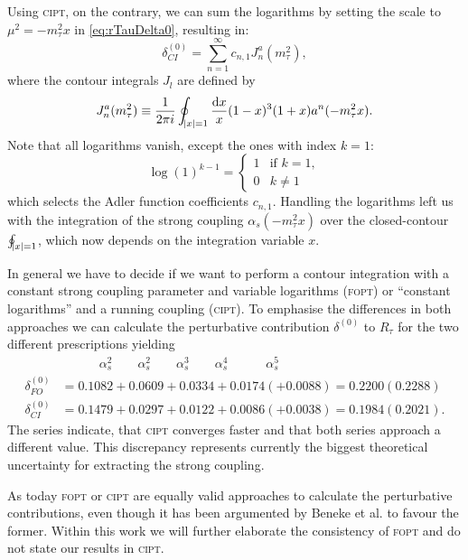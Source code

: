 \documentclass[../../index.tex]{subfiles}
\begin{document}
Using \textsc{cipt}, on the contrary, we can sum the logarithms by setting the
scale to \(\mu^2 = -m_\tau^2 x\) in \cref{eq:rTauDelta0}, resulting in:
\begin{equation}
  \delta^{(0)}_{CI} = \sum_{n=1}^\infty c_{n,1} J_n^a(m_\tau^2),
\end{equation}
where the contour integrals $J_l$ are defined by
\begin{equation}
  J_n^a(m_\tau^2) \equiv \frac{1}{2 \pi i} \oint_{\abs{x}=1} \frac{\dif x}{x} (1-x)^3(1+x) a^n(-m_\tau^2 x).
\end{equation}
Note that all logarithms vanish, except the ones with index \(k=1\):
\begin{equation}
  \log(1)^{k-1} =  \begin{cases} \mbox{1} & \mbox{if } k=1, \\ \mbox{0} & k\neq 1 \end{cases}
\end{equation}
which selects the Adler function coefficients \(c_{n,1}\). Handling the
logarithms left us with the integration of the strong coupling \(\alpha_s(-
m_\tau^2 x)\) over the closed-contour \(\oint_{\abs{x}=1}\), which now depends
on the integration variable \(x\).

In general we have to decide if we want to perform a contour integration with a
constant strong coupling parameter and variable logarithms (\textsc{fopt}) or
``constant logarithms'' and a running coupling (\textsc{cipt}). To emphasise the
differences in both approaches we can calculate the perturbative contribution
\(\delta^{(0)}\) to \(R_\tau\) for the two different prescriptions yielding
\cite{Beneke2008}
\begin{align}
  & \quad\qquad \alpha_s^2 \qquad \alpha_s^2 \qquad \alpha_s^3 \qquad \alpha_s^4 \quad\qquad \alpha_s^5 \nonumber\\
  \delta_{FO}^{(0)} &= 0.1082 + 0.0609 + 0.0334 + 0.0174 (+ 0.0088) = 0.2200 (0.2288) \\
  \delta_{CI}^{(0)} &= 0.1479 + 0.0297 + 0.0122 + 0.0086 (+ 0.0038) = 0.1984 (0.2021).
\end{align}
The series indicate, that \textsc{cipt} converges faster and that both series
approach a different value. This discrepancy represents currently the biggest
theoretical uncertainty for extracting the strong coupling.

As today \textsc{fopt} or \textsc{cipt} are equally valid approaches to
calculate the perturbative contributions, even though it has been argumented by
Beneke et al. \cite{Beneke2008} to favour the former. Within this work we will
further elaborate the consistency of \textsc{fopt} and do not state our results
in \textsc{cipt}.
\end{document}
